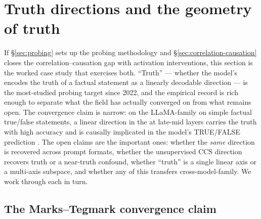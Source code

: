 
\section{Truth directions and the geometry of truth}
\label{sec:truth-directions}

If \S\ref{sec:probing} sets up the probing methodology and
\S\ref{sec:correlation-causation} closes the correlation--causation gap
with activation interventions, this section is the worked case study
that exercises both. ``Truth'' --- whether the model's 
encodes the truth  of a factual statement as a linearly decodable
direction --- is the most-studied probing target since 2022, and the
empirical record is rich enough to separate what the field has actually
converged on from what remains open. The convergence claim is narrow:
on the LLaMA-family on simple factual true/false statements, a linear
direction in the  at late-mid layers carries the truth
 with high  accuracy and is causally implicated in the
model's TRUE/FALSE prediction \citep{marks-tegmark-2023-truth}. The
open claims are the important ones: whether the \emph{same}
direction is recovered across prompt formats, whether the
unsupervised CCS direction recovers truth or a near-truth confound,
whether ``truth'' is a single linear axis or a multi-axis subspace,
and whether any of this transfers cross-model-family. We work through
each in turn.

\subsection{The Marks--Tegmark convergence claim}
\label{sec:truth-marks-tegmark}

